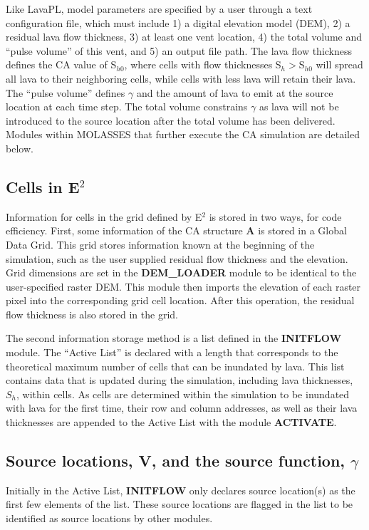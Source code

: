 		
		Like LavaPL, model parameters are specified by a user through a text configuration file, which must include 1) a digital elevation model (DEM), 2) a residual lava flow thickness, 3) at least one vent location, 4) the total volume and ``pulse volume'' of this vent, and 5) an output file path. The lava flow thickness defines the CA value of S$_{h0}$, where cells with flow thicknesses S$_h>$S$_{h0}$ will spread all lava to their neighboring cells, while cells with less lava will retain their lava. The ``pulse volume'' defines $\gamma$ and the amount of lava to emit at the source location at each time step. The total volume constrains $\gamma$ as lava will not be introduced to the source location after the total volume has been delivered. Modules within MOLASSES that further execute the CA simulation are detailed below.
		
	\subsection{Cells in E$^2$}
		Information for cells in the grid defined by E$^2$ is stored in two ways, for code efficiency. First, some information of the CA structure \textbf{A} is stored in a Global Data Grid. This grid stores information known at the beginning of the simulation, such as the user supplied residual flow thickness and the elevation. Grid dimensions are set in the \textbf{DEM\_LOADER} module to be identical to the user-specified raster DEM. This module then imports the elevation of each raster pixel into the corresponding grid cell location. After this operation, the residual flow thickness is also stored in the grid.

		The second information storage method is a list defined in the \textbf{INITFLOW} module. The ``Active List'' is declared with a length that corresponds to the theoretical maximum number of cells that can be inundated by lava. This list contains data that is updated during the simulation, including lava thicknesses, $S_h$, within cells. As cells are determined within the simulation to be inundated with lava for the first time, their row and column addresses, as well as their lava thicknesses are appended to the Active List with the module \textbf{ACTIVATE}.
		
	\subsection{Source locations, V, and the source function, $\gamma$}
		Initially in the Active List, \textbf{INITFLOW} only declares source location(s) as the first few elements of the list. These source locations are flagged in the list to be identified as source locations by other modules.

